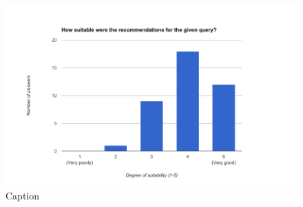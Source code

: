 \begin{figure}[h]
    \centering
    \includegraphics[width=1\textwidth]{fig/questionnaire2_diagrams/12.png}
    \caption[]{Caption}
    \label{fig:my_label}
\end{figure}
